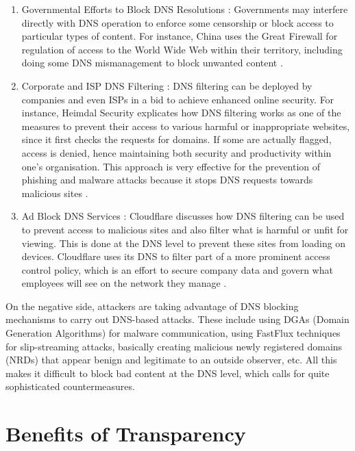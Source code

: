 \begin{enumerate}
    \item Governmental Efforts to Block DNS Resolutions : Governments may interfere directly with DNS operation to enforce some censorship or block access to particular types of content. For instance, China uses the Great Firewall for regulation of access to the World Wide Web within their territory, including doing some DNS mismanagement to block unwanted content \cite{XuAlbert2017MediaCensorship}.
    \item Corporate and ISP DNS Filtering : DNS filtering can be deployed by companies and even ISPs in a bid to achieve enhanced online security. For instance, Heimdal Security explicates how DNS filtering works as one of the measures to prevent their access to various harmful or inappropriate websites, since it first checks the requests for domains. If some are actually flagged, access is denied, hence maintaining both security and productivity within one's organisation. This approach is very effective for the prevention of phishing and malware attacks because it stops DNS requests towards malicious sites \cite{
HeimdalDNSSecurity2023}.
    \item Ad Block DNS Services : Cloudflare discusses how DNS filtering can be used to prevent access to malicious sites and also filter what is harmful or unfit for viewing. This is done at the DNS level to prevent these sites from loading on devices. Cloudflare uses its DNS to filter part of a more prominent access control policy, which is an effort to secure company data and govern what employees will see on the network they manage \cite{CloudflareDNSFiltering2023} .   
\end{enumerate}

 On the negative side, attackers are taking advantage of DNS blocking mechanisms to carry out DNS-based attacks. These include using DGAs (Domain Generation Algorithms) for malware communication, using FastFlux techniques for slip-streaming attacks, basically creating malicious newly registered domains (NRDs) that appear benign and legitimate to an outside observer, etc. All this makes it difficult to block bad content at the DNS level, which calls for quite sophisticated countermeasures.


\section{Benefits of Transparency }


